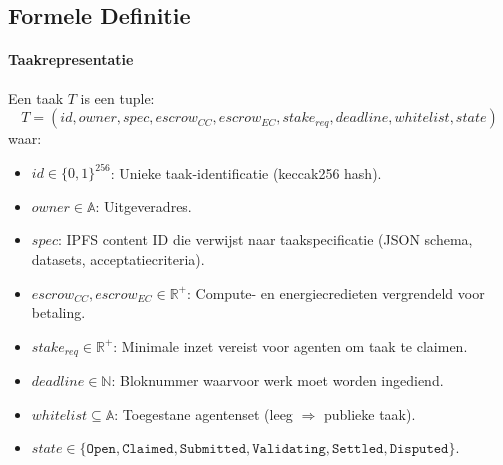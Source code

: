 \documentclass[11pt]{article}
\begin{document}
\subsection{Formele Definitie}
\paragraph{Taakrepresentatie} Een taak $T$ is een tuple:
\begin{equation}
T = (id, owner, spec, escrow_{CC}, escrow_{EC}, stake_{req}, deadline, whitelist, state)
\end{equation}
waar:
\begin{itemize}[noitemsep]
  \item $id \in \{0,1\}^{256}$: Unieke taak-identificatie (keccak256 hash).
  \item $owner \in \mathbb{A}$: Uitgeveradres.
  \item $spec$: IPFS content ID die verwijst naar taakspecificatie (JSON schema, datasets, acceptatiecriteria).
  \item $escrow_{CC}, escrow_{EC} \in \mathbb{R}^+$: Compute- en energiecredieten vergrendeld voor betaling.
  \item $stake_{req} \in \mathbb{R}^+$: Minimale inzet vereist voor agenten om taak te claimen.
  \item $deadline \in \mathbb{N}$: Bloknummer waarvoor werk moet worden ingediend.
  \item $whitelist \subseteq \mathbb{A}$: Toegestane agentenset (leeg $\Rightarrow$ publieke taak).
  \item $state \in \{\texttt{Open}, \texttt{Claimed}, \texttt{Submitted}, \texttt{Validating}, \texttt{Settled}, \texttt{Disputed}\}$.
\end{itemize}
\end{document}
